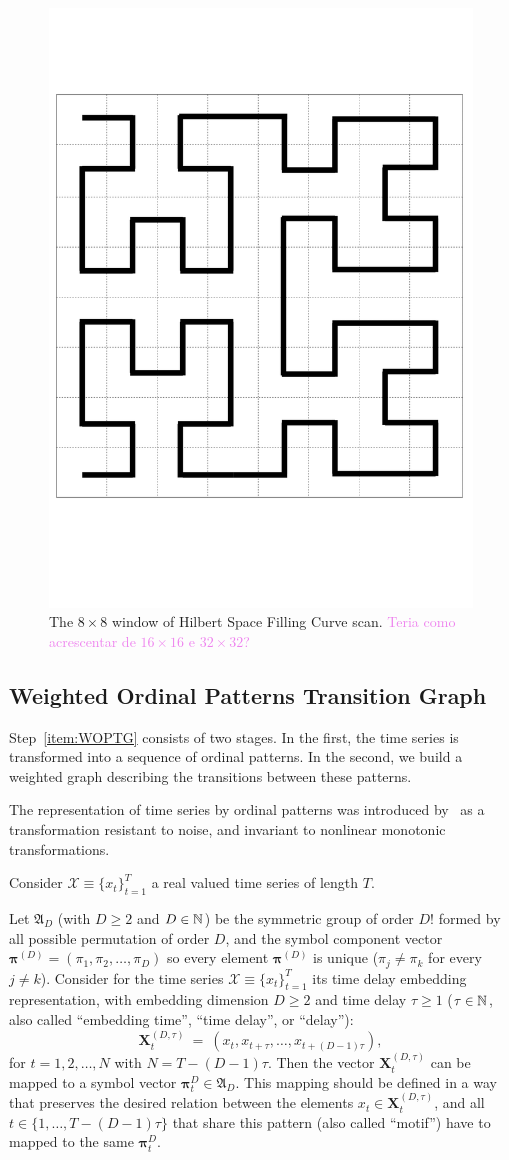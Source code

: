 \documentclass{isprs}
\begin{document}
\begin{figure}[hbt]
	\centering
	\includegraphics[width=.3\linewidth]{Figures/hilbert.png}
	\caption{The $8 \times 8$ window of Hilbert Space Filling Curve scan. \textcolor{violet}{Teria como acrescentar de $16\times16$ e $32\times32$?}}
	\label{fig:Hilbert}
\end{figure}

\subsection{Weighted Ordinal Patterns Transition Graph}\label{WATG}

Step~\ref{item:WOPTG} consists of two stages.
In the first, the time series is transformed into a sequence of ordinal patterns.
In the second, we build a weighted graph describing the transitions between these patterns.

The representation of time series by ordinal patterns was introduced by~\cite{Bandt2002Permutation} as a transformation resistant to noise, and invariant to nonlinear monotonic transformations.

Consider ${\mathcal X} \equiv \{x_t\}_{t=1}^{T}$ a real valued time series of length $T$. 

Let ${\mathfrak A}_{D}$ (with $D \geq 2$ and $D \in {\Bbb N}$) be the symmetric group of order $D!$ formed by all 
possible permutation of order $D$, and the symbol component vector 
${\bm \pi}^{(D)} = (\pi_1, \pi_2, \dots, \pi_D)$ so every element ${\bm \pi}^{(D)}$ is unique 
($\pi_j \neq \pi_k$ for every $j \neq k$). 
Consider for the time series ${\mathcal X} \equiv \{x_t\}_{t=1}^{T}$ its time delay embedding representation,
with embedding dimension $D \geq 2$ and time delay $\tau \geq 1$ ($\tau \in {\Bbb N}$, also called ``embedding time'', ``time delay'', or ``delay''):
\begin{equation} 
\label{eq:time-delay}
{\mathbf X}^{(D,\tau)}_t ~=~( x_t,x_{t+\tau},\dots,x_{t+(D-1)\tau} ) ,
\end{equation} 
for $t = 1,2,\dots,N$ with $N = T-(D-1) \tau$.
Then the vector ${\mathbf X}^{(D,\tau)}_t$ can be mapped to a symbol vector ${\bm \pi}_t^D \in {\mathfrak A}_{D}$. 
This mapping should be defined in a way that preserves the desired relation between the elements 
$x_t  \in {\mathbf X}^{(D,\tau)}_t$, and all $t \in \{1,\dots,T-(D-1)\tau\}$ that share this pattern (also called ``motif'') have to mapped to the same 
${\bm \pi}_t^{D}$.
\end{document}
